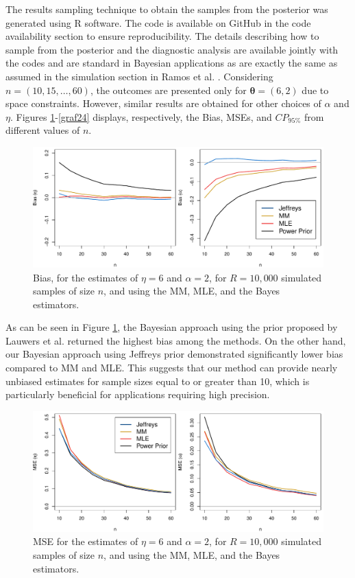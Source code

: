 \documentclass[12pt]{interact}
\theoremstyle{plain}%
\theoremstyle{definition}
\theoremstyle{remark}
\begin{document}
The results sampling technique to obtain the samples from the posterior was generated using R software. The code is available on GitHub in the code availability section to ensure reproducibility. The details describing how to sample from the posterior and the diagnostic analysis are available jointly with the codes and are standard in Bayesian applications as are exactly the same as assumed in the simulation section in Ramos et al. \cite{ramos2018bayesian}. Considering $n=(10,15,\ldots,60)$, the outcomes are presented only for $\boldsymbol\theta=(6,2)$ due to space constraints. However, similar results are obtained for other choices of $\alpha$ and $\eta$. Figures \ref{graf22}-\ref{graf24} displays, respectively, the Bias, MSEs, and $CP_{95\%}$ from different values of $n$.
\begin{figure}[!h]
\centering
\includegraphics[scale=0.5]{fig1.pdf}
\caption{Bias, for the estimates of $\eta =6$ and $\alpha = 2$, for $R=10,000$ simulated samples of size $n$, and using the MM, MLE, and the Bayes estimators.}
\label{graf22}
\end{figure}

As can be seen in Figure \ref{graf22}, the Bayesian approach using the prior proposed by Lauwers et al. \cite{lauwers2009estimating} returned the highest bias among the methods. On the other hand, our Bayesian approach using Jeffreys prior demonstrated significantly lower bias compared to MM and MLE. This suggests that our method can provide nearly unbiased estimates for sample sizes equal to or greater than 10, which is particularly beneficial for applications requiring high precision.


\begin{figure}[!h]
\centering
\includegraphics[scale=0.5]{fig2.pdf}
\caption{MSE for the estimates of $\eta =6$ and $\alpha = 2$, for $R=10,000$ simulated samples of size $n$, and using the MM, MLE, and the Bayes estimators.}
\label{graf23}
\end{figure}
\end{document}

